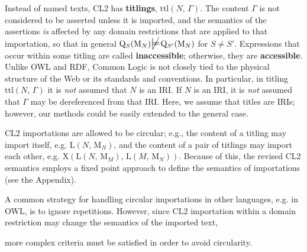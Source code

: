 \documentclass{IOS-Book-Article}
\newcommand{\domOp}[1]{\mathrm{Q}_{#1}}
\newcommand{\txtOp}{\mathrm{X}}
\newcommand{\txtOptwo}[2]{\txtOp(\text{$#1$, $#2$})}
\newcommand{\ttlOp}[2]{\mathrm{L}(\text{$#1$, $#2$})}
\newcommand{\ttlFun}[2]{\mathrm{ttl}(\text{$#1$, $#2$})}
\newcommand{\impOp}[1]{\mathrm{M}_{#1}}
\newcommand{\mdpf}{\ensuremath{\sdtstile[ss]{}{}}}
\DeclareMathOperator*{\nmdpf}{\cancel{\mdpf}}
\newcommand{\mycomment}[1]{}
\begin{document}
Instead of named texts, CL2 has \textbf{titlings}, $\ttlFun{N}{\Gamma}$.
The content $\Gamma$ is not considered to be asserted unless it is imported, and the semantics of the assertions \emph{is} affected by any domain restrictions that are applied to that importation, so that in general $\domOp{S}(\impOp{N}) \nmdpf \domOp{S'}(\impOp{N})$ for $S\neq S'$.
Expressions that occur within some titling are called \textbf{inaccessible}; otherwise, they are \textbf{accessible}. 
Unlike OWL and RDF, Common Logic is not
closely tied to the physical structure of the Web or its standards and conventions.
In particular, in titling $\ttlFun{N}{\Gamma}$ it is \emph{not} assumed that $N$ is an IRI. If $N$ is an IRI, it is \emph{not} assumed that $\Gamma$ may be dereferenced from that IRI.
Here, we assume that titles are IRIs;
however, our methods could be easily extended to the general case.

CL2 importations are allowed to be circular; e.g., the content of a titling may import itself, e.g. $\ttlOp{N}{\impOp{N}}$, 
and the content of a pair of titlings may import each other,
e.g. $\txtOptwo{\ttlOp{N}{\impOp{M}}}{\ttlOp{M}{\impOp{N}}}$.
Because of this, the revised CL2 semantics employs a fixed point approach to define the semantics of importations (see the Appendix).

A common strategy for handling circular importations in other languages, e.g. in OWL, is to ignore repetitions.
However, since CL2 importation within a domain restriction may change the semantics of the imported text, 
\mycomment{so an importation inside of a domain restriction is not redundant, from a logical perspective, 
relative to an importation outside of the domain restriction, 
or within a different domain restriction.
Therefore,}
more complex criteria must be satisfied in order to avoid circularity.
\end{document}
